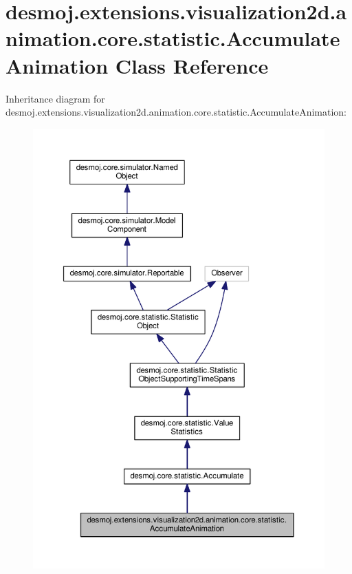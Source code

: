 \section{desmoj.\-extensions.\-visualization2d.\-animation.\-core.\-statistic.\-Accumulate\-Animation Class Reference}
\label{classdesmoj_1_1extensions_1_1visualization2d_1_1animation_1_1core_1_1statistic_1_1_accumulate_animation}


Inheritance diagram for desmoj.\-extensions.\-visualization2d.\-animation.\-core.\-statistic.\-Accumulate\-Animation\-:
\nopagebreak
\begin{figure}[H]
\begin{center}
\leavevmode
\includegraphics[width=350pt]{classdesmoj_1_1extensions_1_1visualization2d_1_1animation_1_1core_1_1statistic_1_1_accumulate_animation__inherit__graph}
\end{center}
\end{figure}


